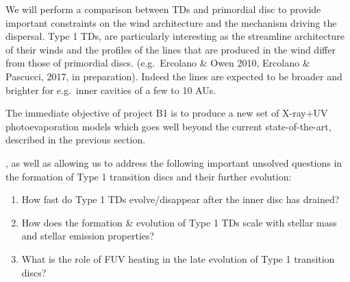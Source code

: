 \documentclass[10pt,fleqn,twoside]{article}
\begin{document}

We will perform a comparison between TDs and
primordial disc to provide important constraints on the wind
architecture and the mechanism driving the dispersal. 
Type 1 TDs, are particularly interesting as the streamline architecture of their winds
and the profiles of the lines that are produced in the wind
differ from those of primordial discs. (e.g.\ Ercolano \& Owen
2010, Ercolano \& Pascucci, 2017, in preparation). Indeed the lines
are expected to be broader and brighter for e.g.\ inner cavities of a few to 10 AUs.  

The immediate objective of project B1 is to produce a new set of
X-ray+UV photoevaporation models which goes well beyond the current
state-of-the-art, described in the previous section. 

, as well as
allowing us to address the following important unsolved questions in
the formation of Type 1 transition discs and their further evolution: 

\begin{enumerate}
\item How fast do Type 1 TDs evolve/disappear after the inner disc has
  drained?
\item How does the formation \& evolution of Type 1 TDs scale with
  stellar mass and stellar emission properties?
\item What is the role of FUV heating in the late evolution of Type 1
  transition discs? 
\end{enumerate}

\end{document}
